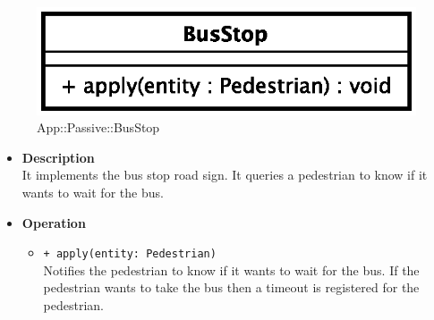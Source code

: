 \begin{figure}[h]
\centering
\includegraphics[scale=0.6,keepaspectratio]{images/solution/bus_stop.eps}
\caption{App::Passive::BusStop}
\label{fig:sd-app-bus_stop}
\end{figure}
\FloatBarrier
\begin{itemize}
  \item \textbf{Description} \\
It implements the bus stop road sign. It queries a pedestrian to know if it wants to wait for the bus.
  \item \textbf{Operation}
  \begin{itemize} 
  \item \texttt{+ apply(entity: Pedestrian)} \\
Notifies the pedestrian to know if it wants to wait for the bus. If the pedestrian wants
to take the bus then a timeout is registered for the pedestrian.
  \end{itemize}
\end{itemize}
